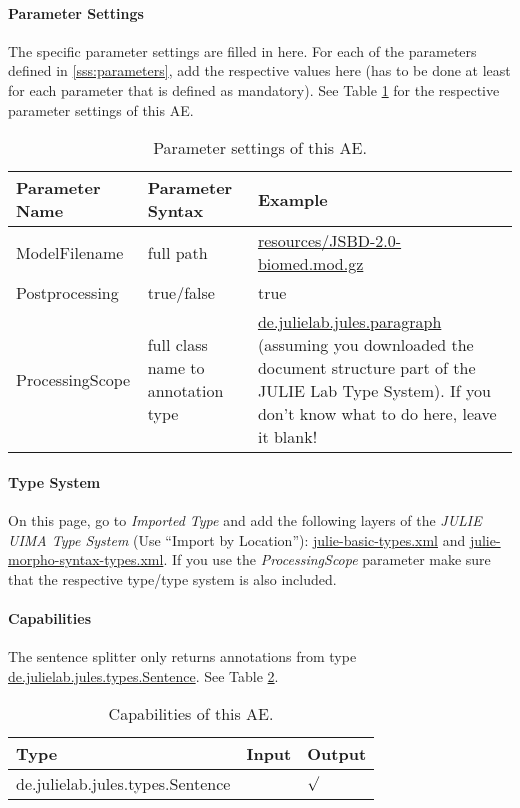 \documentclass[11pt,a4paper,halfparskip]{scrartcl}
\begin{document}
\paragraph{Parameter Settings}
\label{sss:param_settings}

The specific parameter settings are filled in here. For each of the
parameters defined in \ref{sss:parameters}, add the respective values
here (has to be done at least for each parameter that is defined as
mandatory). See Table \ref{tab:param_settings} for the respective
parameter settings of this AE.

\begin{table}[h!]
  \centering
  \begin{tabular}{|p{4cm}|p{4cm}|p{7cm}|}
    \hline
    Parameter Name & Parameter Syntax & Example \\
    \hline\hline
    ModelFilename & full path & \url{resources/JSBD-2.0-biomed.mod.gz}\\
    \hline
    Postprocessing & true/false & true\\
    \hline 
    ProcessingScope & full class name to annotation type & \url{de.julielab.jules.paragraph} (assuming you downloaded the document structure part of the JULIE Lab Type System). If you don't know what to do here, leave it blank!\\
  \hline
  \end{tabular}
  \caption{Parameter settings of this AE.}
  \label{tab:param_settings}
\end{table}

\paragraph{Type System}
\label{sss:type_system}
On this page, go to \emph{Imported Type} and add the following layers
of the \emph{JULIE UIMA Type System} (Use ``Import by Location''):
\url{julie-basic-types.xml} and
\url{julie-morpho-syntax-types.xml}. If you use the
\textit{ProcessingScope} parameter make sure that the respective
type/type system is also included.


\paragraph{Capabilities}
\label{sss:capabilities}
The sentence splitter only returns annotations from type \url{de.julielab.jules.types.Sentence}. See Table \ref{tab:capabilities}.
\begin{table}[h!]
  \centering
  \begin{tabular}{|p{5cm}|p{2cm}|p{2cm}|}
    \hline
    Type & Input & Output \\
    \hline\hline
     de.julielab.jules.types.Sentence & &  $\surd$  \\
      \hline
  \end{tabular}
  \caption{Capabilities of this AE.}
  \label{tab:capabilities}
\end{table} 
\end{document}
